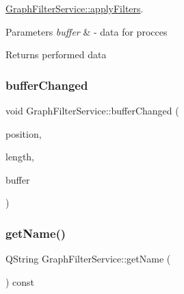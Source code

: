 \hyperlink{class_graph_filter_service_a399267e98d3977af552dfd0c0c39bac2}{Graph\+Filter\+Service\+::apply\+Filters}. 


\begin{DoxyParams}{Parameters}
{\em buffer} & -\/ data for procces \\
\hline
\end{DoxyParams}
\begin{DoxyReturn}{Returns}
performed data 
\end{DoxyReturn}
\hypertarget{class_graph_filter_service_a0e7878bc2027bd8cb1480baf82783ed7}{}\label{class_graph_filter_service_a0e7878bc2027bd8cb1480baf82783ed7} 
\subsubsection{\texorpdfstring{buffer\+Changed}{bufferChanged}}
{\footnotesize\ttfamily void Graph\+Filter\+Service\+::buffer\+Changed (\begin{DoxyParamCaption}\item[{qint64}]{position,  }\item[{qint64}]{length,  }\item[{const Q\+Byte\+Array \&}]{buffer }\end{DoxyParamCaption})\hspace{0.3cm}{\ttfamily [slot]}}

\hypertarget{class_graph_filter_service_a16e88d8a688024ab96a4e3ed6a19e238}{}\label{class_graph_filter_service_a16e88d8a688024ab96a4e3ed6a19e238} 
\subsubsection{\texorpdfstring{get\+Name()}{getName()}}
{\footnotesize\ttfamily Q\+String Graph\+Filter\+Service\+::get\+Name (\begin{DoxyParamCaption}{ }\end{DoxyParamCaption}) const}

\hypertarget{class_graph_filter_service_a0ce26d46d68fd45bc4de9104e9b7a317}{}\label{class_graph_filter_service_a0ce26d46d68fd45bc4de9104e9b7a317} 

